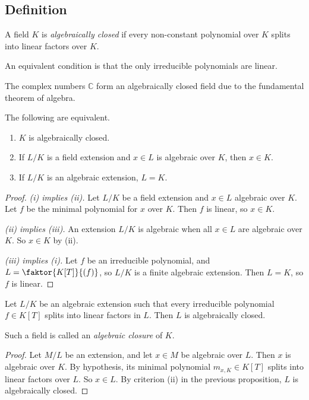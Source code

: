 \subsection{Definition}
\begin{definition}
	A field \( K \) is \emph{algebraically closed} if every non-constant polynomial over \( K \) splits into linear factors over \( K \).
\end{definition}
\begin{remark}
	An equivalent condition is that the only irreducible polynomials are linear.
\end{remark}
\begin{example}
	The complex numbers \( \mathbb C \) form an algebraically closed field due to the fundamental theorem of algebra.
\end{example}
\begin{proposition}
	The following are equivalent.
	\begin{enumerate}
		\item \( K \) is algebraically closed.
		\item If \( L / K \) is a field extension and \( x \in L \) is algebraic over \( K \), then \( x \in K \).
		\item If \( L / K \) is an algebraic extension, \( L = K \).
	\end{enumerate}
\end{proposition}
\begin{proof}
	\emph{(i) implies (ii).}
	Let \( L / K \) be a field extension and \( x \in L \) algebraic over \( K \).
	Let \( f \) be the minimal polynomial for \( x \) over \( K \).
	Then \( f \) is linear, so \( x \in K \).

	\emph{(ii) implies (iii).}
	An extension \( L / K \) is algebraic when all \( x \in L \) are algebraic over \( K \).
	So \( x \in K \) by (ii).

	\emph{(iii) implies (i).}
	Let \( f \) be an irreducible polynomial, and \( L = \faktor{K[T]}{(f)} \), so \( L / K \) is a finite algebraic extension.
	Then \( L = K \), so \( f \) is linear.
\end{proof}
\begin{proposition}
	Let \( L / K \) be an algebraic extension such that every irreducible polynomial \( f \in K[T] \) splits into linear factors in \( L \).
	Then \( L \) is algebraically closed.
\end{proposition}
Such a field is called an \emph{algebraic closure} of \( K \).
\begin{proof}
	Let \( M / L \) be an extension, and let \( x \in M \) be algebraic over \( L \).
	Then \( x \) is algebraic over \( K \).
	By hypothesis, its minimal polynomial \( m_{x,K} \in K[T] \) splits into linear factors over \( L \).
	So \( x \in L \).
	By criterion (ii) in the previous proposition, \( L \) is algebraically closed.
\end{proof}
